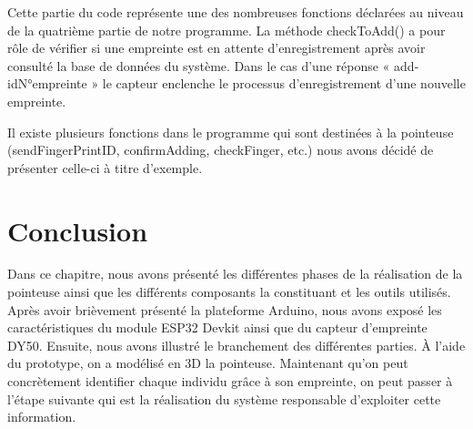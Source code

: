 Cette partie du code représente une des nombreuses fonctions déclarées au niveau
de la quatrième partie de notre programme. La méthode checkToAdd() a pour rôle
de vérifier si une empreinte est en attente d’enregistrement après avoir
consulté la base de données du système. Dans le cas d’une réponse «
add-idN°empreinte » le capteur enclenche le processus d’enregistrement d’une
nouvelle empreinte.

Il existe plusieurs fonctions dans le programme qui sont destinées à la
pointeuse (sendFingerPrintID, confirmAdding, checkFinger, etc.) nous avons
décidé de présenter celle-ci à titre d’exemple.

\section{Conclusion}
Dans ce chapitre, nous avons présenté les différentes phases de la réalisation
de la pointeuse ainsi que les différents composants la constituant et les outils
utilisés. Après avoir brièvement présenté la plateforme Arduino, nous avons
exposé les caractéristiques du module ESP32 Devkit ainsi que du capteur
d’empreinte DY50. Ensuite, nous avons illustré le branchement des différentes
parties. À l’aide du prototype, on a modélisé en 3D la pointeuse.  Maintenant
qu’on peut concrètement identifier chaque individu grâce à son empreinte, on
peut passer à l’étape suivante qui est la réalisation du système responsable
d’exploiter cette information.  
